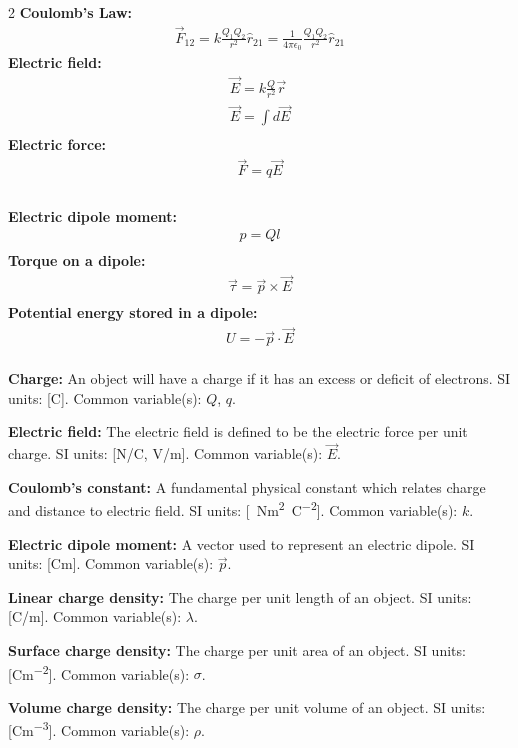 \begin{importantEquations}
\medskip
\begin{multicols}{2}
\textbf{Coulomb's Law:}
\begin{align*}
\vec F_{12}=k\frac{Q_1Q_2}{r^2}\hat r_{21}=\frac{1}{4\pi\epsilon_0}\frac{Q_1Q_2}{r^2}\hat r_{21}
\end{align*}
\textbf{Electric field:}
\begin{align*}
\vec E = k \frac{Q}{r^2}\vec r \\
\vec E = \int d \vec E \\
\end{align*}
\textbf{Electric force:}
\begin{align*}
\vec F = q \vec E \\
\end{align*}
\columnbreak
\\
\textbf{Electric dipole moment:}
\begin{align*}
p = Ql \\
\end{align*}
\textbf{Torque on a dipole:}
\begin{align*}
\vec \tau = \vec p \times \vec E \\
\end{align*}
\textbf{Potential energy stored in a dipole:}
\begin{align*}
U = -\vec p \cdot \vec E \\
\end{align*}
\medskip
\end{multicols}
\end{importantEquations}

\begin{definitions}
	\textbf{Charge:} An object will have a charge if it has an excess or deficit of electrons. SI units: [\si{C}]. Common variable(s): $Q$, $q$.
	\item \textbf{Electric field:} The electric field is defined to be the electric force per unit charge. SI units: [\si{N/C}, \si{V/m}]. Common variable(s): $\vec E$.
	\item \textbf{Coulomb's constant:} A fundamental physical constant which relates charge and distance to electric field. SI units: [\SI{}{Nm^2C^{-2}}]. Common variable(s): $k$.
	\item \textbf{Electric dipole moment:} A vector used to represent an electric dipole. SI units: [\si{Cm}]. Common variable(s): $\vec p$.
	\item \textbf{Linear charge density:} The charge per unit length of an object. SI units: [\si{C/m}]. Common variable(s): $\lambda$.
	\item \textbf{Surface charge density:} The charge per unit area of an object. SI units: [\si{Cm^{-2}}]. Common variable(s): $\sigma$.
	\item \textbf{Volume charge density:} The charge per unit volume of an object. SI units: [\si{Cm^{-3}}]. Common variable(s): $\rho$.
\end{definitions}


